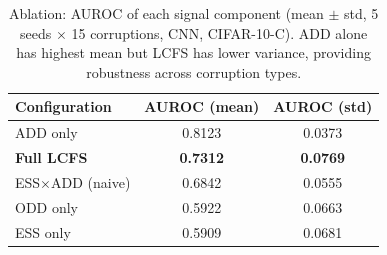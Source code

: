 \begin{table}[t]
\centering
\caption{Ablation: AUROC of each signal component (mean $\pm$ std, 5 seeds $\times$ 15 corruptions, CNN, CIFAR-10-C). ADD alone has highest mean but LCFS has lower variance, providing robustness across corruption types.}
\label{tab:ablation_multiseed}
\begin{tabular}{lcc}
\toprule
Configuration & AUROC (mean) & AUROC (std) \\
\midrule
ADD only & 0.8123 & 0.0373 \\
\textbf{Full LCFS} & \textbf{0.7312} & \textbf{0.0769} \\
ESS$\times$ADD (naive) & 0.6842 & 0.0555 \\
ODD only & 0.5922 & 0.0663 \\
ESS only & 0.5909 & 0.0681 \\
\bottomrule
\end{tabular}
\end{table}